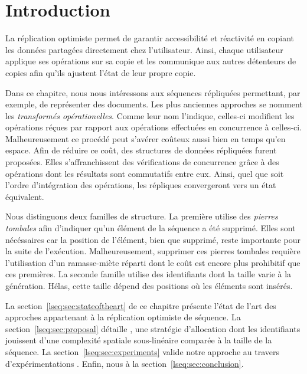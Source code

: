 
\section{Introduction}

La réplication optimiste permet de garantir accessibilité et réactivité en
copiant les données partagées directement chez l'utilisateur. Ainsi, chaque
utilisateur applique ses opérations sur sa copie et les communique aux autres
détenteurs de copies afin qu'ils ajustent l'état de leur propre copie.

Dans ce chapitre, nous nous intéressons aux séquences répliquées  permettant, par exemple, de représenter des
documents. Les plus anciennes approches se nomment les \emph{transformés
  opérationelles}. Comme leur nom l'indique, celles-ci modifient les opérations
réçues par rapport aux opérations effectuées en concurrence à
celles-ci. Malheureusement ce procédé peut s'avérer coûteux aussi bien en temps
qu'en espace.  Afin de réduire ce coût, des structures de données répliquées
furent proposées. Elles s'affranchissent des vérifications de concurrence grâce
à des opérations dont les résultats sont commutatifs entre eux. Ainsi, quel que
soit l'ordre d'intégration des opérations, les répliques convergeront vers un
état équivalent.

Nous distinguons deux familles de structure. La première utilise des
\emph{pierres tombales} afin d'indiquer qu'un élément de la séquence a été
supprimé. Elles sont nécéssaires car la position de l'élément, bien que
supprimé, reste importante pour la suite de l'exécution. Malheureusement,
supprimer ces pierres tombales requière l'utilisation d'un ramasse-miète réparti
dont le coût est encore plus prohibitif que ces premières. La seconde famille
utilise des identifiants dont la taille varie à la génération. Hélas, cette
taille dépend des positions où les éléments sont insérés. 

La section~\ref{lseq:sec:stateoftheart} de ce chapitre présente l'état de l'art
des approches appartenant à la réplication optimiste de séquence. La
section~\ref{lseq:sec:proposal} détaille \LSEQ, une stratégie d'allocation dont
les identifiants jouissent d'une complexité spatiale sous-linéaire comparée à la
taille de la séquence. La section~\ref{lseq:sec:experiments} valide notre
approche au travers d'expérimentations . Enfin, nous
 à la section~\ref{lseq:sec:conclusion}.


